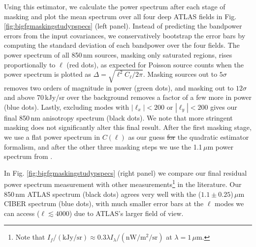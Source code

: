 \documentclass[numberedappendix]{emulateapj}
\providecommand{\DIFadd}[1]{{\protect\color{blue}\uwave{#1}}} %
\providecommand{\DIFdel}[1]{{\protect\color{red}\sout{#1}}}                      %
\providecommand{\DIFaddbegin}{} %
\providecommand{\DIFaddend}{} %
\providecommand{\DIFdelbegin}{} %
\providecommand{\DIFdelend}{} %
\begin{document}
Using this estimator, we calculate the power spectrum after each stage of masking and plot the mean spectrum over all four deep ATLAS fields in Fig. \ref{fig:bigfgmaskingstudypspecs} (left panel). Instead of predicting the bandpower errors from the input covariances, we conservatively bootstrap the error bars by computing the standard deviation
 of each bandpower over the four fields. The power spectrum of all 850\,nm sources, masking only saturated regions, rises proportionally to $\ell$ (red dots), as expected for Poisson source counts when the power spectrum is plotted as $\Delta=\sqrt{\ell^2C_\ell/2\pi}$. Masking sources out to $5\sigma$ removes two orders of magnitude in power (green dots), and masking out to $12\sigma$ and above 70\,kJy/sr over the background removes a factor of a few more in power (blue dots). Lastly, excluding modes with $|\ell_x|<200$ or $|\ell_y|<200$ gives our final 850\,nm anisotropy spectrum (black dots). We note that more stringent masking does not significantly alter this final result. After the first masking stage, we use a flat power spectrum in $C(\ell)$ as our guess \DIFdelbegin \DIFdel{for }\DIFdelend \DIFaddbegin \DIFadd{in }\DIFaddend the quadratic estimator formalism, and after the other three masking steps we use the 1.1\,$\mu$m power spectrum from \citet{zemcov14}.

In Fig. \ref{fig:bigfgmaskingstudypspecs} (right panel) we compare our final residual power spectrum measurement with other measurements\footnote{Note that $I_f/(\text{kJy/sr})\approx0.3\lambda I_\lambda/(\text{nW}/\text{m}^2/\text{sr})$ at $\lambda=1$\,$\mu$m.} in the literature. Our 850\,nm ATLAS spectrum (black dots) agrees very well with the ($1.1\pm0.25$)\,$\mu$m CIBER spectrum \DIFaddbegin \citep{zemcov14} \DIFaddend (blue dots), with much smaller error bars at the $\ell$ modes we can access ($\ell\lesssim4000$) due to ATLAS's larger field of view. 
\end{document}
